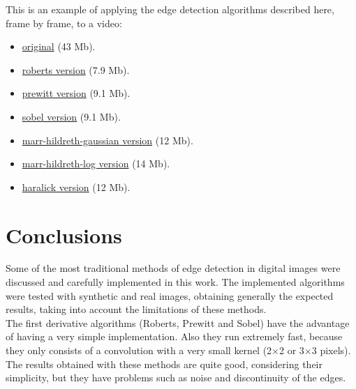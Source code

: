 \documentclass{ipol}
\numberwithin{equation}{section}
\numberwithin{table}{section}
\numberwithin{figure}{section}
\begin{document}
This is an example of applying the edge detection algorithms described here, frame by frame, to a video: 
\begin{itemize}
	\centering
	\item \href{http://iie.fing.edu.uy/~haldos/ipol/video.mov}{original} (43 Mb).
\end{itemize}
\begin{multicols}{2}
\begin{itemize}
	\item \href{http://iie.fing.edu.uy/~haldos/ipol/video-roberts-wide_0.1.mov}{roberts version} (7.9 Mb).
	\item \href{http://iie.fing.edu.uy/~haldos/ipol/video-prewitt-wide_0.1.mov}{prewitt version} (9.1 Mb).
	\item \href{http://iie.fing.edu.uy/~haldos/ipol/video-sobel-wide_0.1.mov}{sobel version} (9.1 Mb).
	\item \href{http://iie.fing.edu.uy/~haldos/ipol/video-marr-hildreth-gaussian-wide_3_19_0.04.mov}{marr-hildreth-gaussian version} (12 Mb).
	\item \href{http://iie.fing.edu.uy/~haldos/ipol/video-marr-hildreth-log-wide_3_25_0.04.mov}{marr-hildreth-log version} (14 Mb).
	\item \href{http://iie.fing.edu.uy/~haldos/ipol/video-haralick-wide_0.5.mov}{haralick version} (12 Mb).
\end{itemize}
\end{multicols}

\clearpage


\section{Conclusions}
\label{sec:conclusions}

Some of the most traditional methods of edge detection in digital images were discussed and carefully implemented in this work. The implemented algorithms were tested with synthetic and real images, obtaining generally the expected results, taking into account the limitations of these methods. \\

The first derivative algorithms (Roberts, Prewitt and Sobel) have the advantage of having a very simple implementation. Also they run extremely fast, because they only consists of a convolution with a very small kernel (2$\times$2 or 3$\times$3 pixels). The results obtained with these methods are quite good, considering their simplicity, but they have problems such as noise and discontinuity of the edges. \\
\end{document}
